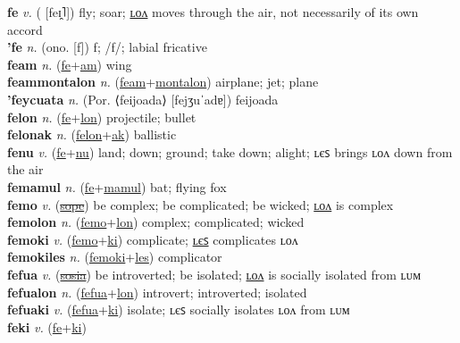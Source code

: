 \textbf{fe} \textit{v.} ( [feɪ̯˥])
fly; soar; \hyperref[felon]{ʟᴏᴧ} moves through the air, not necessarily of its own accord \label{fe} \\
\textbf{'fe} \textit{n.} (ono. [f])
f; /f/; labial fricative \label{'fe} \\
\textbf{feam} \textit{n.} (\hyperref[fe]{fe}+\hyperref[am]{am})
wing \label{feam} \\
\textbf{feammontalon} \textit{n.} (\hyperref[feam]{feam}+\hyperref[montalon]{montalon})
airplane; jet; plane \label{feammontalon} \\
\textbf{'feycuata} \textit{n.} (Por. ⟨feijoada⟩ [fejʒuˈadɐ])
feijoada \label{'feycuata} \\
\textbf{felon} \textit{n.} (\hyperref[fe]{fe}+\hyperref[lon]{lon})
projectile; bullet \label{felon} \\
\textbf{felonak} \textit{n.} (\hyperref[felon]{felon}+\hyperref[ak]{ak})
ballistic \label{felonak} \\
\textbf{fenu} \textit{v.} (\hyperref[fe]{fe}+\hyperref[nu]{nu})
land; down; ground; take down; alight; ʟєꜱ brings ʟᴏᴧ down from the air \label{fenu} \\
\textbf{femamul} \textit{n.} (\hyperref[fe]{fe}+\hyperref[mamul]{mamul})
bat; flying fox \label{femamul} \\
\textbf{femo} \textit{v.} (\hyperref[sope]{\sout{sope}})
be complex; be complicated; be wicked; \hyperref[femolon]{ʟᴏᴧ} is complex \label{femo} \\
\textbf{femolon} \textit{n.} (\hyperref[femo]{femo}+\hyperref[lon]{lon})
complex; complicated; wicked \label{femolon} \\
\textbf{femoki} \textit{v.} (\hyperref[femo]{femo}+\hyperref[ki]{ki})
complicate; \hyperref[femokiles]{ʟєꜱ} complicates ʟᴏᴧ \label{femoki} \\
\textbf{femokiles} \textit{n.} (\hyperref[femoki]{femoki}+\hyperref[les]{les})
complicator \label{femokiles} \\
\textbf{fefua} \textit{v.} (\hyperref[sosia]{\sout{sosia}})
be introverted; be isolated; \hyperref[fefualon]{ʟᴏᴧ} is socially isolated from ʟᴜᴍ \label{fefua} \\
\textbf{fefualon} \textit{n.} (\hyperref[fefua]{fefua}+\hyperref[lon]{lon})
introvert; introverted; isolated \label{fefualon} \\
\textbf{fefuaki} \textit{v.} (\hyperref[fefua]{fefua}+\hyperref[ki]{ki})
isolate; ʟєꜱ socially isolates ʟᴏᴧ from ʟᴜᴍ \label{fefuaki} \\
\textbf{feki} \textit{v.} (\hyperref[fe]{fe}+\hyperref[ki]{ki})
